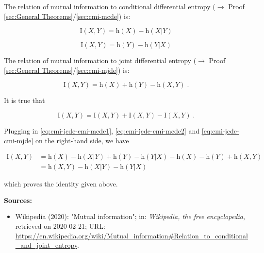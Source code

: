\documentclass[a4paper,12pt]{book}
\begin{document}
The relation of mutual information to conditional differential entropy ($\rightarrow$ Proof \ref{sec:General Theorems}/\ref{sec:cmi-mcde}) is:

\begin{equation} \label{eq:cmi-jcde-cmi-mcde1}
\mathrm{I}(X,Y) = \mathrm{h}(X) - \mathrm{h}(X|Y)
\end{equation}

\begin{equation} \label{eq:cmi-jcde-cmi-mcde2}
\mathrm{I}(X,Y) = \mathrm{h}(Y) - \mathrm{h}(Y|X)
\end{equation}

The relation of mutual information to joint differential entropy ($\rightarrow$ Proof \ref{sec:General Theorems}/\ref{sec:cmi-mjde}) is:

\begin{equation} \label{eq:cmi-jcde-cmi-mjde}
\mathrm{I}(X,Y) = \mathrm{h}(X) + \mathrm{h}(Y) - \mathrm{h}(X,Y) \; .
\end{equation}

It is true that

\begin{equation} \label{eq:cmi-jcde-MI-s1}
\mathrm{I}(X,Y) = \mathrm{I}(X,Y) + \mathrm{I}(X,Y) - \mathrm{I}(X,Y) \; .
\end{equation}

Plugging in \eqref{eq:cmi-jcde-cmi-mcde1}, \eqref{eq:cmi-jcde-cmi-mcde2} and \eqref{eq:cmi-jcde-cmi-mjde} on the right-hand side, we have

\begin{equation} \label{eq:cmi-jcde-MI-s2}
\begin{split}
\mathrm{I}(X,Y) &= \mathrm{h}(X) - \mathrm{h}(X|Y) + \mathrm{h}(Y) - \mathrm{h}(Y|X) - \mathrm{h}(X) - \mathrm{h}(Y) + \mathrm{h}(X,Y) \\
&= \mathrm{h}(X,Y) - \mathrm{h}(X|Y) - \mathrm{h}(Y|X)
\end{split}
\end{equation}

which proves the identity given above.

\vspace{1em}
\textbf{Sources:}
\begin{itemize}
\item Wikipedia (2020): "Mutual information"; in: \textit{Wikipedia, the free encyclopedia}, retrieved on 2020-02-21; URL: \url{https://en.wikipedia.org/wiki/Mutual_information#Relation_to_conditional_and_joint_entropy}.
\end{itemize}
\end{document}
